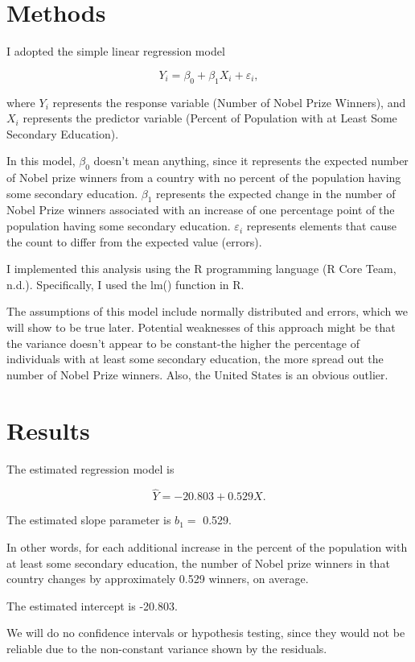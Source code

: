 \documentclass[
  letterpaper,
  DIV=11,
  numbers=noendperiod]{scrartcl}
\begin{document}
\section{Methods}\label{sec-methods}

I adopted the simple linear regression model

\[
Y_i = \beta_0 + \beta_1 X_i + \varepsilon_i,
\]

where \(Y_i\) represents the response variable (Number of Nobel Prize
Winners), and \(X_i\) represents the predictor variable (Percent of
Population with at Least Some Secondary Education).

In this model, \(\beta_0\) doesn't mean anything, since it represents
the expected number of Nobel prize winners from a country with no
percent of the population having some secondary education. \(\beta_1\)
represents the expected change in the number of Nobel Prize winners
associated with an increase of one percentage point of the population
having some secondary education. \(\varepsilon_i\) represents elements
that cause the count to differ from the expected value (errors).

I implemented this analysis using the R programming language (R Core
Team, n.d.). Specifically, I used the lm() function in R.

The assumptions of this model include normally distributed and errors,
which we will show to be true later. Potential weaknesses of this
approach might be that the variance doesn't appear to be constant-the
higher the percentage of individuals with at least some secondary
education, the more spread out the number of Nobel Prize winners. Also,
the United States is an obvious outlier.

\section{Results}\label{sec-results}

The estimated regression model is

\[
\widehat{Y}
=
-20.803
+
0.529X.
\]

The estimated slope parameter is \(b_1 =\) 0.529.

In other words, for each additional increase in the percent of the
population with at least some secondary education, the number of Nobel
prize winners in that country changes by approximately 0.529 winners, on
average.

The estimated intercept is -20.803.

We will do no confidence intervals or hypothesis testing, since they
would not be reliable due to the non-constant variance shown by the
residuals.
\end{document}

